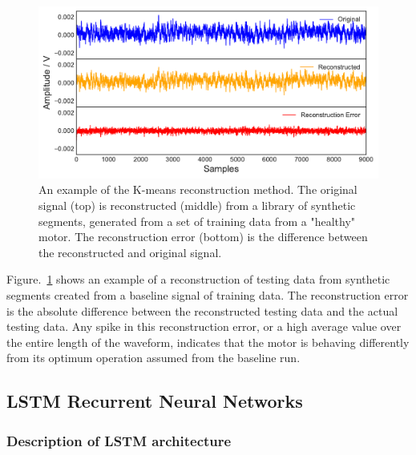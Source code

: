 \begin{figure}[t]
    \includegraphics[width=1.0\textwidth]{fig/kmeans2.pdf}
    \caption[K mean clustering plot]{An example of the K-means reconstruction method. The original signal (top) is reconstructed (middle) from a library of synthetic segments, generated from a set of training data from a "healthy" motor. The reconstruction error (bottom) is the difference between the reconstructed and original signal.}
    \label{fig:kmeanerror}
\end{figure}

Figure.~\ref{fig:kmeanerror} shows an example of a reconstruction of testing data from synthetic segments created from a baseline signal of training data. The reconstruction error is the absolute difference between the reconstructed testing data and the actual testing data. Any spike in this reconstruction error, or a high average value over the entire length of the waveform, indicates that the motor is behaving differently from its optimum operation assumed from the baseline run.

\subsection{LSTM Recurrent Neural Networks}
\label{subsec:LSTM}

\subsubsection{Description of LSTM architecture}


